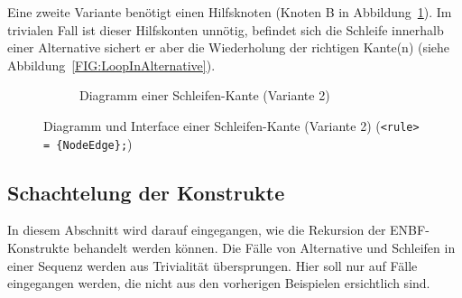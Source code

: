 \documentclass[../InterneDSLs.tex]{subfiles}
\begin{document}
Eine zweite Variante benötigt einen Hilfsknoten (Knoten B in Abbildung~\ref{FIG:DiagramLoopNodeAlt}). Im trivialen Fall ist dieser Hilfskonten unnötig, befindet sich die Schleife innerhalb einer Alternative sichert er aber die Wiederholung der richtigen Kante(n) (siehe Abbildung~\ref{FIG:LoopInAlternative}).
\begin{figure}[ht]
\centering
  \begin{subfigure}[c]{0.49\textwidth}
    \caption{Diagramm einer Schleifen-Kante (Variante 2)}
    \label{FIG:DiagramLoopNodeAlt}
  \end{subfigure}
  \begin{subfigure}[c]{0.49\textwidth}
    
  \end{subfigure}
  \caption{Diagramm und Interface einer Schleifen-Kante (Variante 2) (\texttt{<rule> = \{NodeEdge\};})}
  \label{FIG:LoopNodeAlt}
\end{figure}


\subsection{Schachtelung der Konstrukte}
In diesem Abschnitt wird darauf eingegangen, wie die Rekursion der ENBF-Konstrukte behandelt werden können. Die Fälle von Alternative und Schleifen in einer Sequenz werden aus Trivialität übersprungen. Hier soll nur auf Fälle eingegangen werden, die nicht aus den vorherigen Beispielen ersichtlich sind.
\end{document}
